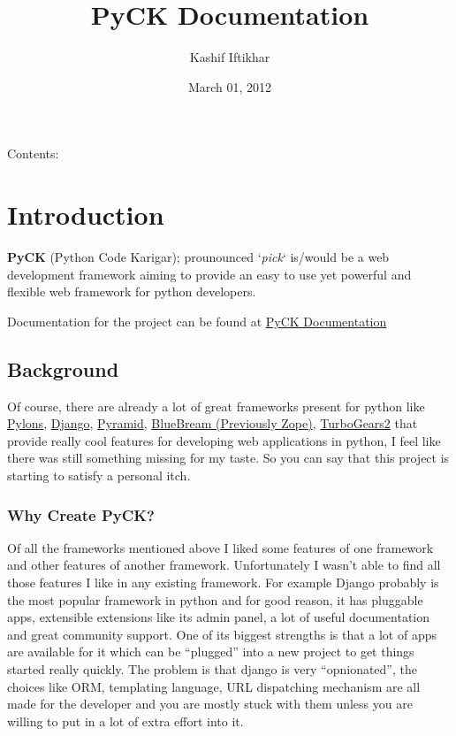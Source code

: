 \documentclass[letterpaper,10pt,english]{sphinxmanual}
\title{PyCK Documentation}
\date{March 01, 2012}
\author{Kashif Iftikhar}
\begin{document}
\maketitle
\tableofcontents
{}\label{index::doc}


Contents:


\chapter{Introduction}
\label{README:introduction}\label{README::doc}\label{README:welcome-to-pyck-s-documentation}\label{README:id1}
\textbf{PyCK} (Python Code Karigar); prounounced `\emph{pick}` is/would be a web development framework
aiming to provide an easy to use yet powerful and flexible web framework for python developers.

Documentation for the project can be found at \href{http://packages.python.org/PyCK/}{PyCK Documentation}


\section{Background}
\label{README:background}
Of course, there are already a lot of great frameworks present for python like \href{http://docs.pylonsproject.org/en/latest/docs/pylons.html}{Pylons}, \href{https://www.djangoproject.com/}{Django}, \href{http://docs.pylonsproject.org/en/latest/docs/pyramid.html}{Pyramid}, \href{http://bluebream.zope.org/}{BlueBream (Previously Zope)}, \href{http://turbogears.org/}{TurboGears2} that provide really cool
features for developing web applications in python, I feel like there was still something missing for my taste. So you can say that this project is starting to satisfy a personal itch.


\subsection{Why Create PyCK?}
\label{README:why-create-pyck}
Of all the frameworks mentioned above I liked some features of one framework and other features of another framework. Unfortunately I wasn't able to find all those features I like in any existing framework. For example Django probably is the most popular framework in python and for good reason, it has pluggable apps, extensible extensions like its admin panel, a lot of useful documentation and great community support. One of its biggest strengths is that a lot of apps are available for it which can be ``plugged'' into a new project to get things started really quickly. The problem is that django is very ``opnionated'', the choices like ORM, templating language, URL dispatching mechanism are all made for the developer and you are mostly stuck with them unless you are willing to put in a lot of extra effort into it.
\end{document}
